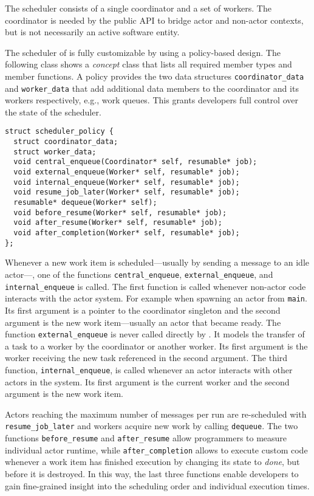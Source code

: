 The scheduler consists of a single coordinator and a set of workers. The coordinator is needed by the public API to bridge actor and non-actor contexts, but is not necessarily an active software entity.

The scheduler of \lib is fully customizable by using a policy-based design. The following class shows a \emph{concept} class that lists all required member types and member functions. A policy provides the two data structures \lstinline^coordinator_data^ and \lstinline^worker_data^ that add additional data members to the coordinator and its workers respectively, e.g., work queues.
This grants developers full control over the state of the scheduler.

\begin{lstlisting}
struct scheduler_policy {
  struct coordinator_data;
  struct worker_data;
  void central_enqueue(Coordinator* self, resumable* job);
  void external_enqueue(Worker* self, resumable* job);
  void internal_enqueue(Worker* self, resumable* job);
  void resume_job_later(Worker* self, resumable* job);
  resumable* dequeue(Worker* self);
  void before_resume(Worker* self, resumable* job);
  void after_resume(Worker* self, resumable* job);
  void after_completion(Worker* self, resumable* job);
};
\end{lstlisting}

Whenever a new work item is scheduled---usually by sending a message to an idle actor---, one of the functions \lstinline^central_enqueue^, \lstinline^external_enqueue^, and \lstinline^internal_enqueue^ is called.
The first function is called whenever non-actor code interacts with the actor system. For example when spawning an actor from \lstinline^main^.
Its first argument is a pointer to the coordinator singleton and the second argument is the new work item---usually an actor that became ready.
The function \lstinline^external_enqueue^ is never called directly by \lib.
It models the transfer of a task to a worker by the coordinator or another worker.
Its first argument is the worker receiving the new task referenced in the second argument. 
The third function, \lstinline^internal_enqueue^, is called whenever an actor interacts with other actors in the system. Its first argument is the current worker and the second argument is the new work item.

Actors reaching the maximum number of messages per run are re-scheduled with \lstinline^resume_job_later^ and workers acquire new work by calling \lstinline^dequeue^. The two functions \lstinline^before_resume^ and \lstinline^after_resume^ allow programmers to measure individual actor runtime, while \lstinline^after_completion^ allows to execute custom code whenever a work item has finished execution by changing its state to \emph{done}, but before it is destroyed.
In this way, the last three functions enable developers to gain fine-grained insight into the scheduling order and individual execution times.

